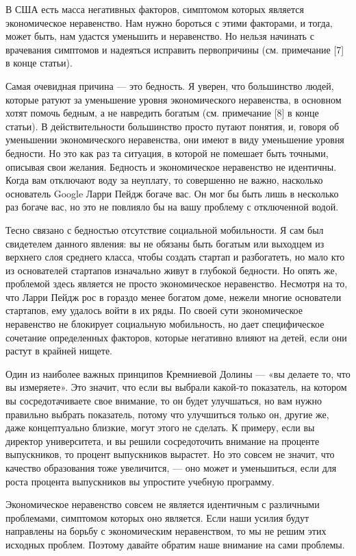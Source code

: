 \documentclass[ebook,12pt,oneside,openany]{memoir}
\begin{document}
В США есть масса негативных факторов, симптомом которых является
экономическое неравенство. Нам нужно бороться с этими факторами, и
тогда, может быть, нам удастся уменьшить и неравенство. Но нельзя
начинать с врачевания симптомов и надеяться исправить первопричины
(см. примечание [7] в конце статьи).

Самая очевидная причина — это бедность. Я уверен, что большинство
людей, которые ратуют за уменьшение уровня экономического неравенства,
в основном хотят помочь бедным, а не навредить богатым (см. примечание
[8] в конце статьи). В действительности большинство просто путают
понятия, и, говоря об уменьшении экономического неравенства, они имеют
в виду уменьшение уровня бедности. Но это как раз та ситуация, в
которой не помешает быть точными, описывая свои желания. Бедность и
экономическое неравенство не идентичны. Когда вам отключают воду за
неуплату, то совершенно не важно, насколько основатель Google Ларри
Пейдж богаче вас. Он мог бы быть лишь в несколько раз богаче вас, но
это не повлияло бы на вашу проблему с отключенной водой.

Тесно связано с бедностью отсутствие социальной мобильности. Я сам был
свидетелем данного явления: вы не обязаны быть богатым или выходцем из
верхнего слоя среднего класса, чтобы создать стартап и разбогатеть, но
мало кто из основателей стартапов изначально живут в глубокой
бедности. Но опять же, проблемой здесь является не просто
экономическое неравенство. Несмотря на то, что Ларри Пейдж рос в
гораздо менее богатом доме, нежели многие основатели стартапов, ему
удалось войти в их ряды. По своей сути экономическое неравенство не
блокирует социальную мобильность, но дает специфическое сочетание
определенных факторов, которые негативно влияют на детей, если они
растут в крайней нищете.

Один из наиболее важных принципов Кремниевой Долины — «вы делаете то,
что вы измеряете». Это значит, что если вы выбрали какой-то
показатель, на котором вы сосредотачиваете свое внимание, то он будет
улучшаться, но вам нужно правильно выбрать показатель, потому что
улучшиться только он, другие же, даже концептуально близкие, могут
этого не сделать. К примеру, если вы директор университета, и вы
решили сосредоточить внимание на проценте выпускников, то процент
выпускников вырастет. Но это совсем не значит, что качество
образования тоже увеличится, — оно может и уменьшиться, если для роста
процента выпускников вы упростите учебную программу.

Экономическое неравенство совсем не является идентичным с различными
проблемами, симптомом которых оно является. Если наши усилия будут
направлены на борьбу с экономическим неравенством, то мы не решим этих
исходных проблем. Поэтому давайте обратим наше внимание на сами
проблемы.
\end{document}
